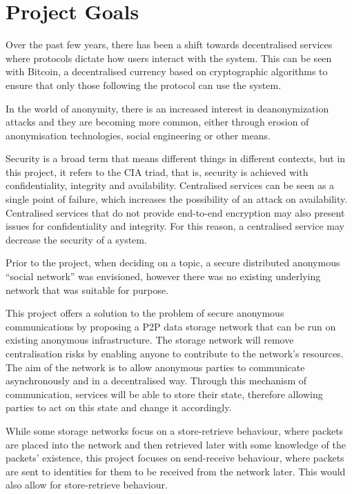 \section{Project Goals}
	Over the past few years, there has been a shift towards decentralised services where protocols dictate how users interact with the system. This can be seen with Bitcoin, a decentralised currency based on cryptographic algorithms to ensure that only those following the protocol can use the system.
	
	
	In the world of anonymity, there is an increased interest in deanonymization attacks and they are becoming more common, either through erosion of anonymisation technologies, social engineering or other means.
	
	Security is a broad term that means different things in different contexts, but in this project, it refers to the CIA triad, that is, security is achieved with confidentiality, integrity and availability. Centralised services can be seen as a single point of failure, which increases the possibility of an attack on availability. Centralised services that do not provide end-to-end encryption may also present issues for confidentiality and integrity. For this reason, a centralised service may decrease the security of a system.
	
	Prior to the project, when deciding on a topic, a secure distributed anonymous ``social network'' was envisioned, however there was no existing underlying network that was suitable for purpose.
	
	This project offers a solution to the problem of secure anonymous communications by proposing a P2P data storage network that can be run on existing anonymous infrastructure. The storage network will remove centralisation risks by enabling anyone to contribute to the network's resources. The aim of the network is to allow anonymous parties to communicate asynchronously and in a decentralised way. Through this mechanism of communication, services will be able to store their state, therefore allowing parties to act on this state and change it accordingly.
	
	While some storage networks focus on a store-retrieve behaviour, where packets are placed into the network and then retrieved later with some knowledge of the packets' existence, this project focuses on send-receive behaviour, where packets are sent to identities for them to be received from the network later. This would also allow for store-retrieve behaviour. 
	
